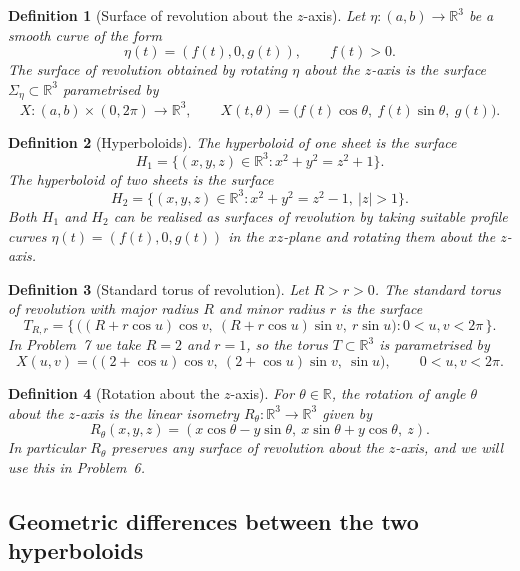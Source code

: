 \documentclass[12pt,a4paper]{article}
\theoremstyle{plain}
\newtheorem{definition}{Definition}
\theoremstyle{definition}      %
\begin{document}
\begin{definition}[Surface of revolution about the $z$-axis]
	Let $\eta:(a,b)\to\mathbb{R}^3$ be a smooth curve of the form
	\[
	\eta(t) = (f(t),0,g(t)),\qquad f(t)>0.
	\]
	The \emph{surface of revolution} obtained by rotating $\eta$ about the
	$z$-axis is the surface $\Sigma_\eta\subset\mathbb{R}^3$ parametrised by
	\[
	X:(a,b)\times(0,2\pi)\longrightarrow\mathbb{R}^3,\qquad
	X(t,\theta) = \bigl(f(t)\cos\theta,\ f(t)\sin\theta,\ g(t)\bigr).
	\]
\end{definition}

\begin{definition}[Hyperboloids]
	The \emph{hyperboloid of one sheet} is the surface
	\[
	H_1 = \{(x,y,z)\in\mathbb{R}^3 : x^2 + y^2 = z^2 + 1\}.
	\]
	The \emph{hyperboloid of two sheets} is the surface
	\[
	H_2 = \{(x,y,z)\in\mathbb{R}^3 : x^2 + y^2 = z^2 - 1,\ |z|>1\}.
	\]
	Both $H_1$ and $H_2$ can be realised as surfaces of revolution by taking
	suitable profile curves $\eta(t)=(f(t),0,g(t))$ in the $xz$-plane and
	rotating them about the $z$-axis.
\end{definition}

\begin{definition}[Standard torus of revolution]
	Let $R>r>0$. The \emph{standard torus of revolution} with major radius
	$R$ and minor radius $r$ is the surface
	\[
	T_{R,r} = \bigl\{\,\bigl((R+r\cos u)\cos v,\ (R+r\cos u)\sin v,\ r\sin u\bigr)
	: 0<u,v<2\pi\,\bigr\}.
	\]
	In Problem~7 we take $R=2$ and $r=1$, so the torus $T\subset\mathbb{R}^3$
	is parametrised by
	\[
	X(u,v) = \bigl((2+\cos u)\cos v,\ (2+\cos u)\sin v,\ \sin u\bigr),
	\qquad 0<u,v<2\pi.
	\]
\end{definition}

\begin{definition}[Rotation about the $z$-axis]
	For $\theta\in\mathbb{R}$, the \emph{rotation of angle $\theta$ about the
		$z$-axis} is the linear isometry $R_\theta:\mathbb{R}^3\to\mathbb{R}^3$
	given by
	\[
	R_\theta(x,y,z)
	= (x\cos\theta - y\sin\theta,\ x\sin\theta + y\cos\theta,\ z).
	\]
	In particular $R_\theta$ preserves any surface of revolution about the
	$z$-axis, and we will use this in Problem~6.
\end{definition}


\subsection*{Geometric differences between the two hyperboloids}
\end{document}
